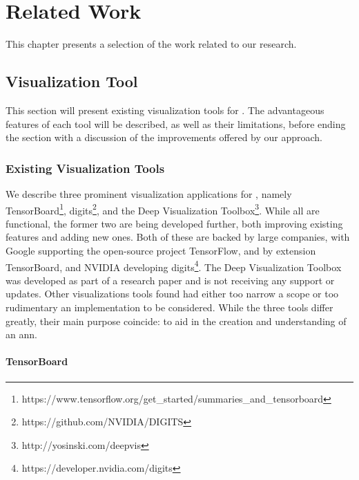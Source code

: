 
\chapter{Related Work}

This chapter presents a selection of the work related to our research.

\section{Visualization Tool}

This section will present existing visualization tools for . The advantageous features of each tool will be described, as well as their limitations, before ending the section with a discussion of the improvements offered by our approach. 

\subsection{Existing Visualization Tools}

We describe three prominent visualization applications for , namely TensorBoard\footnote{https://www.tensorflow.org/get\_started/summaries\_and\_tensorboard}, \acrfull{digits}\footnote{https://github.com/NVIDIA/DIGITS}, and the Deep Visualization Toolbox\footnote{http://yosinski.com/deepvis}. While all are functional, the former two are being developed further, both improving existing features and adding new ones. Both of these are backed by large companies, with Google supporting the open-source project TensorFlow, and by extension TensorBoard, and NVIDIA developing \acrshort{digits}\footnote{https://developer.nvidia.com/digits}. The Deep Visualization Toolbox was developed as part of a research paper and is not receiving any support or updates. Other visualizations tools found had either too narrow a scope or too rudimentary an implementation to be considered. While the three tools differ greatly, their main purpose coincide: to aid in the creation and understanding of an \acrshort{ann}.

\subsubsection{TensorBoard}

